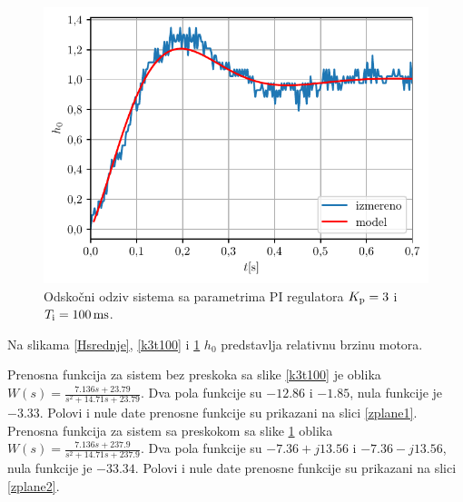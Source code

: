 \documentclass[a4paper, 12pt, diplomski]{etf}
\begin{document}
\begin{figure}[h!]
    \centering
    \includegraphics[scale=1]{fig_pi/k3t10.pdf}
    \caption{Odskočni odziv sistema sa parametrima PI regulatora $K_{\rm p} = 3$ i $T_{\rm i} = 100 \, \rm{ms}$.}
    \label{k3t10}
\end{figure}

\break

Na slikama \ref{Hsrednje}, \ref{k3t100} i \ref{k3t10} $h_0$ predstavlja relativnu brzinu motora.

Prenosna funkcija za sistem bez preskoka sa slike \ref{k3t100} je oblika $W(s) = \frac{7.136 s + 23.79}{s^2 + 14.71 s + 23.79}$. Dva pola funkcije su $-12.86$ i $-1.85$, nula funkcije je $-3.33$. Polovi i nule date prenosne funkcije su prikazani na slici \ref{zplane1}. Prenosna funkcija za sistem sa preskokom sa slike \ref{k3t10} oblika $W(s) = \frac{7.136 s + 237.9}{s^2 + 14.71 s + 237.9}$. Dva pola funkcije su $-7.36 + j13.56$ i $-7.36 - j13.56$, nula funkcije je $-33.34$. Polovi i nule date prenosne funkcije su prikazani na slici \ref{zplane2}. \cite{dos}
\end{document}
